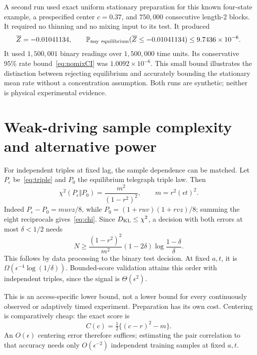 \documentclass[11pt,a4paper]{article}
\begin{document}
A second run used exact uniform stationary preparation for this known four-state example, a prespecified center $c=0.37$, and $750{,}000$ consecutive length-2 blocks. It required no thinning and no mixing input to its test. It produced
\[
\overline Z=-0.01041134,\qquad
\mathbb P_{\rm any\ equilibrium}(\overline Z\leq-0.01041134)
\leq9.7436\times10^{-6}.
\]
It used $1{,}500{,}001$ binary readings over $1{,}500{,}000$ time units. Its conservative 95\% rate bound~\eqref{eq:nomixCI} was $1.0092\times10^{-6}$. This small bound illustrates the distinction between rejecting equilibrium and accurately bounding the stationary mean rate without a concentration assumption. Both runs are synthetic; neither is physical experimental evidence.

\section{Weak-driving sample complexity and alternative power}
For independent triples at fixed lag, the sample dependence can be matched. Let $P_\epsilon$ be~\eqref{eq:triple} and $P_0$ the equilibrium telegraph triple law. Then
\begin{equation}\label{eq:chi}
\chi^2(P_\epsilon\Vert P_0)=\frac{m^2}{(1-r^2)^2},\qquad
m=r^2(\epsilon t)^2.
\end{equation}
Indeed $P_\epsilon-P_0=muvz/8$, while $P_0=(1+ruv)(1+rvz)/8$; summing the eight reciprocals gives~\eqref{eq:chi}. Since $D_{\mathrm{KL}}\leq\chi^2$, a decision with both errors at most $\delta<1/2$ needs
\[
N\geq\frac{(1-r^2)^2}{m^2}(1-2\delta)
       \log\frac{1-\delta}{\delta}.
\]
This follows by data processing to the binary test decision. At fixed $a,t$, it is $\Omega(\epsilon^{-4}\log(1/\delta))$. Bounded-score validation attains this order with independent triples, since the signal is $\Theta(\epsilon^2)$.

This is an access-specific lower bound, not a lower bound for every continuously observed or adaptively timed experiment. Preparation has its own cost. Centering is comparatively cheap: the exact score is
\[
C(c)=\tfrac12\{(c-r)^2-m\}.
\]
An $O(\epsilon)$ centering error therefore suffices; estimating the pair correlation to that accuracy needs only $O(\epsilon^{-2})$ independent training samples at fixed $a,t$.
\end{document}
